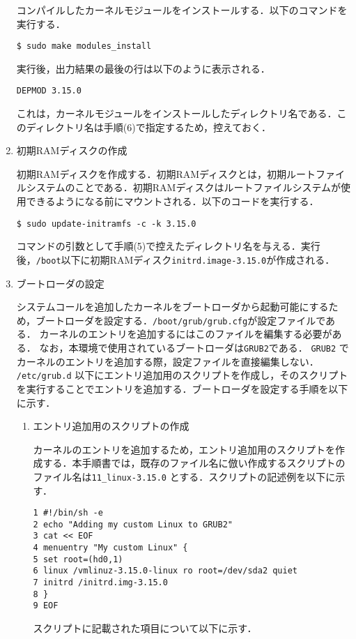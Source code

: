 \documentclass[12pt]{jsarticle}
\begin{document}
\begin{enumerate}
コンパイルしたカーネルモジュールをインストールする．以下のコマンドを実行する．
\begin{verbatim}
$ sudo make modules_install
\end{verbatim}
実行後，出力結果の最後の行は以下のように表示される．
\begin{verbatim}
DEPMOD 3.15.0
\end{verbatim}
これは，カーネルモジュールをインストールしたディレクトリ名である．このディレクトリ名は手順(6)で指定するため，控えておく．

\item 初期RAMディスクの作成

初期RAMディスクを作成する．初期RAMディスクとは，初期ルートファイルシステムのことである．初期RAMディスクはルートファイルシステムが使用できるようになる前にマウントされる．以下のコードを実行する．
\begin{verbatim}
$ sudo update-initramfs -c -k 3.15.0
\end{verbatim}
コマンドの引数として手順(5)で控えたディレクトリ名を与える．実行後，\verb|/boot|以下に初期RAMディスク\verb|initrd.image-3.15.0|が作成される．

\item ブートローダの設定

システムコールを追加したカーネルをブートローダから起動可能にするため，ブートローダを設定する．\verb|/boot/grub/grub.cfg|が設定ファイルである．
カーネルのエントリを追加するにはこのファイルを編集する必要がある．
なお，本環境で使用されているブートローダは\verb|GRUB2|である．
\verb|GRUB2| でカーネルのエントリを追加する際，設定ファイルを直接編集しない． \verb|/etc/grub.d| 以下にエントリ追加用のスクリプトを作成し，そのスクリプトを実行することでエントリを追加する．ブートローダを設定する手順を以下に示す．


\begin{enumerate}
\item エントリ追加用のスクリプトの作成

カーネルのエントリを追加するため，エントリ追加用のスクリプトを作成する．本手順書では，既存のファイル名に倣い作成するスクリプトのファイル名は\verb|11_linux-3.15.0| とする．スクリプトの記述例を以下に示す．
\begin{verbatim}
1 #!/bin/sh -e
2 echo "Adding my custom Linux to GRUB2"
3 cat << EOF
4 menuentry "My custom Linux" {
5 set root=(hd0,1)
6 linux /vmlinuz-3.15.0-linux ro root=/dev/sda2 quiet
7 initrd /initrd.img-3.15.0
8 }
9 EOF
\end{verbatim}
スクリプトに記載された項目について以下に示す．


\end{enumerate}
\end{enumerate}
\end{document}

